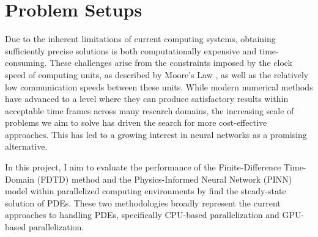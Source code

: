 \section{Problem Setups}
Due to the inherent limitations of current computing systems, 
obtaining sufficiently precise solutions is both computationally expensive and time-consuming. 
These challenges arise from the constraints imposed by the clock speed of computing units, 
as described by 
Moore's Law \cite{Moore_Law}, 
as well as the relatively low communication speeds between these units. 
While modern numerical methods have advanced to a level where they can produce 
satisfactory results within acceptable time frames across many research domains, 
the increasing scale of problems we aim to solve has driven the search for more 
cost-effective approaches. This has led to a growing interest in neural networks as a promising alternative.

In this project, I aim to evaluate the performance of the Finite-Difference Time-Domain (FDTD) 
method and the Physics-Informed Neural Network (PINN) model within parallelized computing 
environments by find the steady-state solution of PDEs.
These two methodologies broadly represent the current approaches to 
handling PDEs, specifically 
CPU-based parallelization and GPU-based parallelization.

